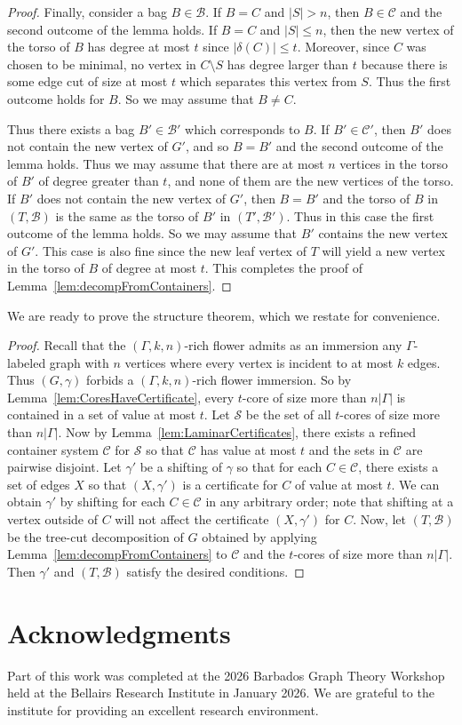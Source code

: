 \documentclass[11pt]{article}
\theoremstyle{definition}
\begin{document}
\begin{proof}
    Finally, consider a bag $B \in \mathscr{B}$. If $B=C$ and $|S|>n$, then $B \in \mathcal{C}$ and the second outcome of the lemma holds. If $B=C$ and $|S|\leq n$, then the new vertex of the torso of $B$ has degree at most $t$ since $|\delta(C)| \leq t$. Moreover, since $C$ was chosen to be minimal, no vertex in $C\setminus S$ has degree larger than $t$ because there is some edge cut of size at most $t$ which separates this vertex from $S$. Thus the first outcome holds for $B$. So we may assume that $B\neq C$. 
    
    Thus there exists a bag $B' \in \mathscr{B}'$ which corresponds to $B$. If $B' \in \mathcal{C}'$, then $B'$ does not contain the new vertex of $G'$, and so $B=B'$ and the second outcome of the lemma holds. Thus we may assume that there are at most $n$ vertices in the torso of $B'$ of degree greater than $t$, and none of them are the new vertices of the torso. If $B'$ does not contain the new vertex of $G'$, then $B=B'$ and the torso of $B$ in $(T, \mathscr{B})$ is the same as the torso of $B'$ in $(T', \mathscr{B}')$. Thus in this case the first outcome of the lemma holds. So we may assume that $B'$ contains the new vertex of $G'$. This case is also fine since the new leaf vertex of $T$ will yield a new vertex in the torso of $B$ of degree at most $t$. This completes the proof of Lemma~\ref{lem:decompFromContainers}.
\end{proof}

We are ready to prove the structure theorem, which we restate for convenience.

\maintheorem*

\begin{proof}
    Recall that the $(\Gamma, k, n)$-rich flower admits as an immersion any $\Gamma$-labeled graph with $n$ vertices where every vertex is incident to at most $k$ edges. Thus $(G, \gamma)$ forbids a $(\Gamma, k, n)$-rich flower immersion. So by Lemma~\ref{lem:CoresHaveCertificate}, every $t$-core of size more than $n|\Gamma|$ is contained in a set of value at most $t$. Let $\mathcal{S}$ be the set of all $t$-cores of size more than $n|\Gamma|$. Now by Lemma~\ref{lem:LaminarCertificates}, there exists a refined container system $\mathcal{C}$ for $\mathcal{S}$ so that $\mathcal{C}$ has value at most $t$ and the sets in $\mathcal{C}$ are pairwise disjoint. Let $\gamma'$ be a shifting of $\gamma$ so that for each $C \in \mathcal{C}$, there exists a set of edges $X$ so that $(X, \gamma')$ is a certificate for $C$ of value at most $t$. We can obtain $\gamma'$ by shifting for each $C \in \mathcal{C}$ in any arbitrary order; note that shifting at a vertex outside of $C$ will not affect the certificate $(X, \gamma')$ for $C$. Now, let $(T, \mathscr{B})$ be the tree-cut decomposition of $G$ obtained by applying Lemma~\ref{lem:decompFromContainers} to $\mathcal{C}$ and the $t$-cores of size more than $n|\Gamma|$. Then $\gamma'$ and $(T, \mathscr{B})$ satisfy the desired conditions.
\end{proof}


\section{Acknowledgments}
Part of this work was completed at the 2026 Barbados Graph Theory Workshop held at the Bellairs Research Institute in January 2026. We are grateful to the institute for providing an excellent research environment. 


\end{document}
